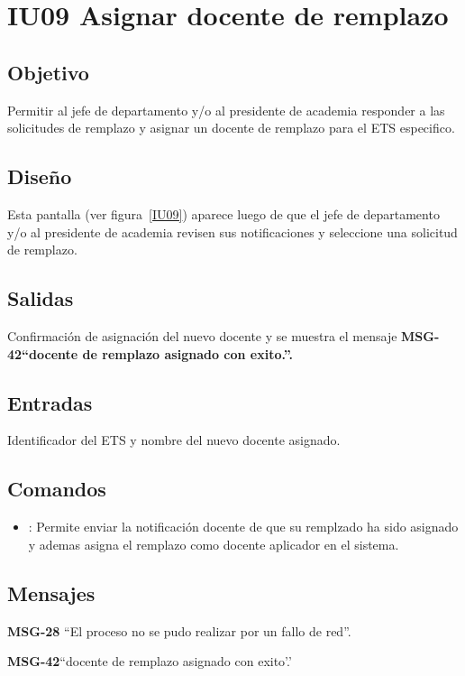 \section{IU09 Asignar docente de remplazo}

\subsection{Objetivo}
Permitir al jefe de departamento y/o al presidente de academia responder a las solicitudes de remplazo y asignar un docente de remplazo para el ETS especifico.

\subsection{Diseño}
Esta pantalla  (ver figura~\ref{IU09}) aparece luego de que el jefe de departamento y/o al presidente de academia revisen sus notificaciones y seleccione una solicitud de remplazo.


\subsection{Salidas}
Confirmación de asignación del nuevo docente y se muestra el mensaje \bf MSG-42{``docente de remplazo asignado con exito.''}.

\subsection{Entradas}
Identificador del ETS y nombre del nuevo docente asignado.

\subsection{Comandos}
\begin{itemize}
	\item {}: Permite enviar la notificación docente de que su remplzado ha sido asignado y ademas asigna el remplazo como docente aplicador en el sistema.
\end{itemize}

\subsection{Mensajes}

\begin{Citemize}
	\item {\bf MSG-28} {``El proceso no se pudo realizar por un fallo de red''.}
	\item {\bf MSG-42}{``docente de remplazo asignado con exito'.'}
\end{Citemize}


